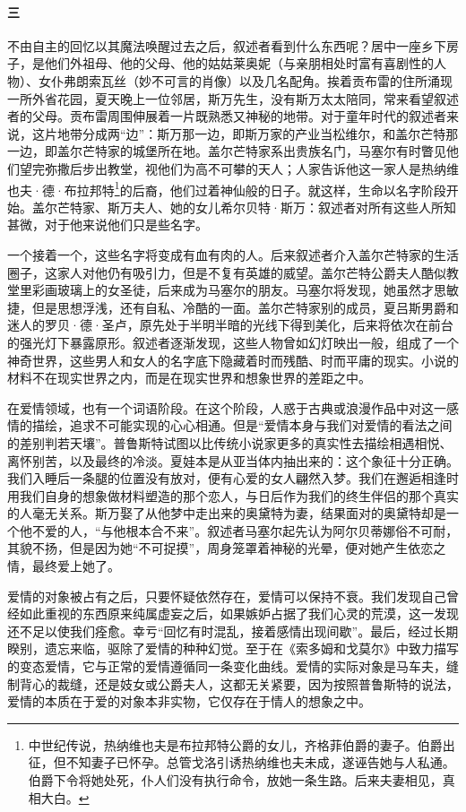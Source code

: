 \paragraph*{三}
\par 不由自主的回忆以其魔法唤醒过去之后，叙述者看到什么东西呢？居中一座乡下房子，是他们外祖母、他的父母、他的姑姑莱奥妮（与亲朋相处时富有喜剧性的人物）、女仆弗朗索瓦丝（妙不可言的肖像）以及几名配角。挨着贡布雷的住所涌现一所外省花园，夏天晚上一位邻居，斯万先生，没有斯万太太陪同，常来看望叙述者的父母。贡布雷周围伸展着一片既熟悉又神秘的地带。对于童年时代的叙述者来说，这片地带分成两“边”：斯万那一边，即斯万家的产业当松维尔，和盖尔芒特那一边，即盖尔芒特家的城堡所在地。盖尔芒特家系出贵族名门，马塞尔有时瞥见他们望完弥撒后步出教堂，视他们为高不可攀的天人；人家告诉他这一家人是热纳维也夫·德·布拉邦特\footnote{中世纪传说，热纳维也夫是布拉邦特公爵的女儿，齐格菲伯爵的妻子。伯爵出征，但不知妻子已怀孕。总管戈洛引诱热纳维也夫未成，遂诬告她与人私通。伯爵下令将她处死，仆人们没有执行命令，放她一条生路。后来夫妻相见，真相大白。}的后裔，他们过着神仙般的日子。就这样，生命以名字阶段开始。盖尔芒特家、斯万夫人、她的女儿希尔贝特·斯万：叙述者对所有这些人所知甚微，对于他来说他们只是些名字。
\par 一个接着一个，这些名字将变成有血有肉的人。后来叙述者介入盖尔芒特家的生活圈子，这家人对他仍有吸引力，但是不复有英雄的威望。盖尔芒特公爵夫人酷似教堂里彩画玻璃上的女圣徒，后来成为马塞尔的朋友。马塞尔将发现，她虽然才思敏捷，但是思想浮浅，还有自私、冷酷的一面。盖尔芒特家别的成员，夏吕斯男爵和迷人的罗贝·德·圣卢，原先处于半明半暗的光线下得到美化，后来将依次在前台的强光灯下暴露原形。叙述者逐渐发现，这些人物曾如幻灯映出一般，组成了一个神奇世界，这些男人和女人的名字底下隐藏着时而残酷、时而平庸的现实。小说的材料不在现实世界之内，而是在现实世界和想象世界的差距之中。
\par 在爱情领域，也有一个词语阶段。在这个阶段，人惑于古典或浪漫作品中对这一感情的描绘，追求不可能实现的心心相通。但是“爱情本身与我们对爱情的看法之间的差别判若天壤”。普鲁斯特试图以比传统小说家更多的真实性去描绘相遇相悦、离怀别苦，以及最终的冷淡。夏娃本是从亚当体内抽出来的：这个象征十分正确。我们入睡后一条腿的位置没有放对，便有心爱的女人翩然入梦。我们在邂逅相逢时用我们自身的想象做材料塑造的那个恋人，与日后作为我们的终生伴侣的那个真实的人毫无关系。斯万娶了从他梦中走出来的奥黛特为妻，结果面对的奥黛特却是一个他不爱的人，“与他根本合不来”。叙述者马塞尔起先认为阿尔贝蒂娜俗不可耐，其貌不扬，但是因为她“不可捉摸”，周身笼罩着神秘的光晕，便对她产生依恋之情，最终爱上她了。
\par 爱情的对象被占有之后，只要怀疑依然存在，爱情可以保持不衰。我们发现自己曾经如此重视的东西原来纯属虚妄之后，如果嫉妒占据了我们心灵的荒漠，这一发现还不足以使我们痊愈。幸亏“回忆有时混乱，接着感情出现间歇”。最后，经过长期睽别，遗忘来临，驱除了爱情的种种幻觉。至于在《索多姆和戈莫尔》中致力描写的变态爱情，它与正常的爱情遵循同一条变化曲线。爱情的实际对象是马车夫，缝制背心的裁缝，还是妓女或公爵夫人，这都无关紧要，因为按照普鲁斯特的说法，爱情的本质在于爱的对象本非实物，它仅存在于情人的想象之中。
